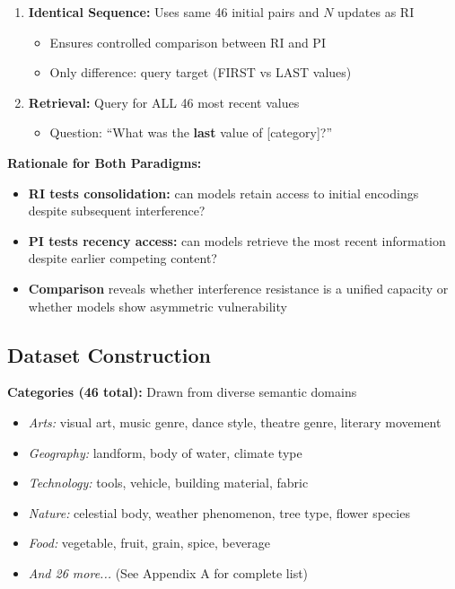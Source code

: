 \documentclass{article}
\begin{document}
\begin{enumerate}[itemsep=4pt,topsep=4pt,parsep=0pt]
    \item \textbf{Identical Sequence:} Uses same 46 initial pairs and $N$ updates as RI
    \begin{itemize}[itemsep=1pt,topsep=2pt,parsep=0pt]
        \item Ensures controlled comparison between RI and PI
        \item Only difference: query target (FIRST vs LAST values)
    \end{itemize}
    \item \textbf{Retrieval:} Query for ALL 46 most recent values
    \begin{itemize}[itemsep=1pt,topsep=2pt,parsep=0pt]
        \item Question: ``What was the \textbf{last} value of [category]?''
    \end{itemize}
\end{enumerate}

\textbf{Rationale for Both Paradigms:}
\begin{itemize}[itemsep=1pt,topsep=2pt,parsep=0pt]
    \item \textbf{RI tests consolidation:} can models retain access to initial encodings despite subsequent interference?
    \item \textbf{PI tests recency access:} can models retrieve the most recent information despite earlier competing content?
    \item \textbf{Comparison} reveals whether interference resistance is a unified capacity or whether models show asymmetric vulnerability
\end{itemize}

\subsection{Dataset Construction}

\textbf{Categories (46 total):} Drawn from diverse semantic domains
\begin{itemize}[itemsep=2pt,topsep=3pt,parsep=0pt]
    \item \textit{Arts:} visual art, music genre, dance style, theatre genre, literary movement
    \item \textit{Geography:} landform, body of water, climate type
    \item \textit{Technology:} tools, vehicle, building material, fabric
    \item \textit{Nature:} celestial body, weather phenomenon, tree type, flower species
    \item \textit{Food:} vegetable, fruit, grain, spice, beverage
    \item \textit{And 26 more...} (See Appendix A for complete list)
\end{itemize}
\end{document}
